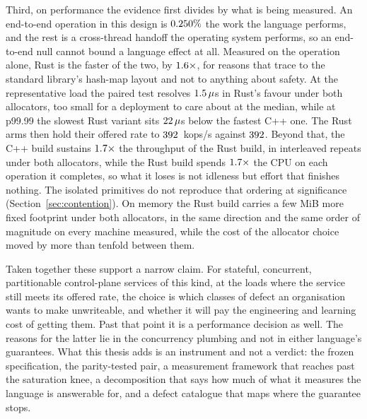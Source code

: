 \documentclass[english,oneside,a4paper,censored,csm,software-track-2020]{HYthesisML}
\begin{document}
Third, on performance the evidence first divides by what is being measured. An end-to-end
operation in this design is $0.250\%$ the work the language performs, and the
rest is a cross-thread handoff the operating system performs, so an end-to-end null cannot
bound a language effect at all. Measured on the operation alone, Rust is the faster of the
two, by $1.6\times$, for reasons that trace to the standard library's hash-map
layout and not to anything about safety. At the representative load the paired test
resolves $1.5\,\mu$s in Rust's favour under both allocators, too small for a
deployment to care about at the median, while at p99.99 the slowest Rust variant sits
$22\,\mu$s below the fastest C++ one. The Rust arms then hold their offered
rate to $392$~kops/s against $392$. Beyond that, the C++ build
sustains $1.7\times$ the throughput of the Rust build, in \OverloadThrAgree{}
interleaved repeats under both allocators, while the Rust build spends
$1.7\times$ the CPU on each operation it completes, so what it loses is
not idleness but effort that finishes nothing. The isolated primitives do not reproduce
that ordering at significance (Section~\ref{sec:contention}). On memory the Rust build
carries a few MiB more fixed footprint under both allocators, in the same direction and
the same order of magnitude on every machine measured, while the cost of the allocator
choice moved by more than tenfold between them.

Taken together these support a narrow claim. For stateful, concurrent, partitionable
control-plane services of this kind, at the loads where the service still meets its offered
rate, the choice is which classes of defect an organisation wants to make unwriteable, and
whether it will pay the engineering and learning cost of getting them. Past that point it
is a performance decision as well. The reasons for the latter lie in the concurrency
plumbing and not in either language's guarantees. What this thesis adds is an instrument
and not a verdict: the frozen specification, the parity-tested pair, a measurement
framework that reaches past the saturation knee, a decomposition that says how much of what
it measures the language is answerable for, and a defect catalogue that maps where the
guarantee stops.
\end{document}
